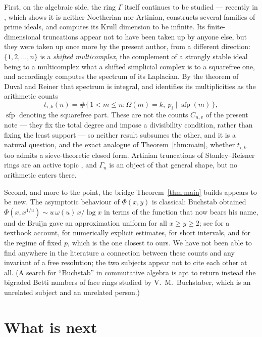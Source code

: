 \documentclass[a4paper,11pt,oneside,reqno]{amsart}
\theoremstyle{definition}
\theoremstyle{remark}
\theoremstyle{plain}
\newcommand{\Om}{\Omega}
\newcommand{\Gam}{\Gamma}
\begin{document}
First, on the algebraic side, the ring \(\Gam\) itself continues to be
studied --- recently in \cite{GoswamiKleynPorrill}, which shows it is neither
Noetherian nor Artinian, constructs several families of prime ideals, and
computes its Krull dimension to be infinite. Its finite-dimensional truncations
appear not to have been taken up by anyone else, but they were taken up once
more by the present author, from a different direction: \(\{1,2,\dots,n\}\) is
a \emph{shifted multicomplex}, the complement of a strongly stable ideal being
to a multicomplex what a shifted simplicial complex is to a squarefree one, and
\cite{SnellmanLaplacians} accordingly computes the spectrum of its Laplacian.
By the theorem of Duval and Reiner \cite{DuvalReiner} that spectrum is integral,
and \cite[Cor.~14]{SnellmanLaplacians} identifies its multiplicities as the
arithmetic counts
\[
  t_{i,k}(n) = \#\{\,1 < m \le n : \Om(m) = k,\ p_i \mid \operatorname{sfp}(m)\,\},
\]
\(\operatorname{sfp}\) denoting the squarefree part. These are not the counts
\(C_{n,v}\) of the present note --- they fix the total degree and impose a
divisibility condition, rather than fixing the least support --- so neither
result subsumes the other, and it is a natural question, and the exact analogue
of Theorem~\ref{thm:main}, whether \(t_{i,k}\) too admits a sieve-theoretic
closed form. Artinian truncations of Stanley--Reisner rings are an active topic
\cite{Miyashita}, and \(\Gam_n\) is an object of that general shape, but no
arithmetic enters there.

Second, and more to the point, the bridge Theorem~\ref{thm:main} builds appears
to be new. The asymptotic behaviour of \(\Phi(x,y)\) is classical: Buchstab
\cite{Buchstab} obtained \(\Phi(x,x^{1/u}) \sim u\,\omega(u)\,x/\log x\) in
terms of the function that now bears his name, and de Bruijn \cite{deBruijn}
gave an approximation uniform for all \(x \ge y \ge 2\); see
\cite{Tenenbaum} for a textbook account, \cite{Fan} for numerically explicit
estimates, \cite{Gorodetsky} for short intervals, and \cite{Holt} for the
regime of fixed \(p\), which is the one closest to ours. We have not been able
to find anywhere in the literature a connection between these counts and any
invariant of a free resolution; the two subjects appear not to cite each other
at all. (A search for ``Buchstab'' in commutative algebra is apt to return
instead the bigraded Betti numbers of face rings studied by V.~M.~Buchstaber,
which is an unrelated subject and an unrelated person.)

\section{What is next}\label{sec:next}
\end{document}

